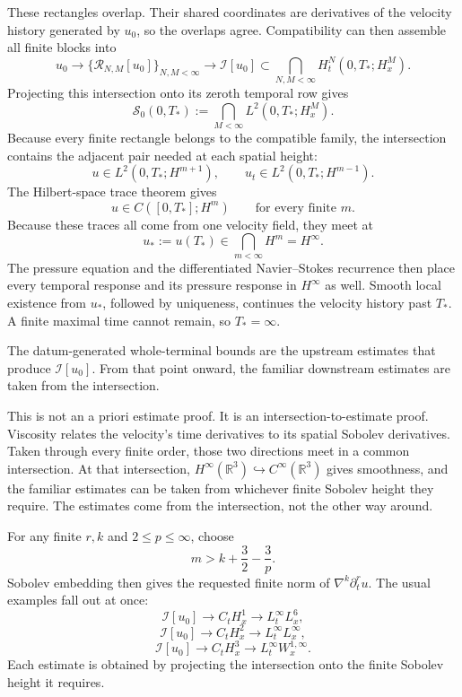 \documentclass[11pt]{article}
\begin{document}
These rectangles overlap. Their shared coordinates are derivatives of the velocity history generated by \(u_0\), so the overlaps agree. Compatibility can then assemble all finite blocks into
\[
u_0
\longrightarrow
\{\mathcal R_{N,M}[u_0]\}_{N,M<\infty}
\longrightarrow
\mathcal I[u_0]
\subset
\bigcap_{N,M<\infty}H_t^N(0,T_*;H_x^M).
\]
Projecting this intersection onto its zeroth temporal row gives
\[
\mathscr S_0(0,T_*)
:=
\bigcap_{M<\infty}L^2(0,T_*;H_x^M).
\]
Because every finite rectangle belongs to the compatible family, the intersection contains the adjacent pair needed at each spatial height:
\[
u\in L^2(0,T_*;H^{m+1}),
\qquad
u_t\in L^2(0,T_*;H^{m-1}).
\]
The Hilbert-space trace theorem gives
\[
u\in C([0,T_*];H^m)
\qquad\text{for every finite }m.
\]
Because these traces all come from one velocity field, they meet at
\[
u_*:=u(T_*)\in\bigcap_{m<\infty}H^m=H^\infty.
\]
The pressure equation and the differentiated Navier--Stokes recurrence then place every temporal response and its pressure response in \(H^\infty\) as well. Smooth local existence from \(u_*\), followed by uniqueness, continues the velocity history past \(T_*\). A finite maximal time cannot remain, so \(T_*=\infty\).

The datum-generated whole-terminal bounds are the upstream estimates that produce \(\mathcal I[u_0]\). From that point onward, the familiar downstream estimates are taken from the intersection.

This is not an a priori estimate proof. It is an intersection-to-estimate proof. Viscosity relates the velocity's time derivatives to its spatial Sobolev derivatives. Taken through every finite order, those two directions meet in a common intersection. At that intersection, \(H^\infty(\mathbb R^3)\hookrightarrow C^\infty(\mathbb R^3)\) gives smoothness, and the familiar estimates can be taken from whichever finite Sobolev height they require. The estimates come from the intersection, not the other way around.

For any finite \(r,k\) and \(2\leq p\leq\infty\), choose
\[
m>k+\frac32-\frac3p.
\]
Sobolev embedding then gives the requested finite norm of \(\nabla^k\partial_t^ru\). The usual examples fall out at once:
\[
\mathcal I[u_0]
\longrightarrow C_tH_x^1
\longrightarrow L_t^\infty L_x^6,
\]
\[
\mathcal I[u_0]
\longrightarrow C_tH_x^2
\longrightarrow L_t^\infty L_x^\infty,
\]
\[
\mathcal I[u_0]
\longrightarrow C_tH_x^3
\longrightarrow L_t^\infty W_x^{1,\infty}.
\]
Each estimate is obtained by projecting the intersection onto the finite Sobolev height it requires.
\end{document}

